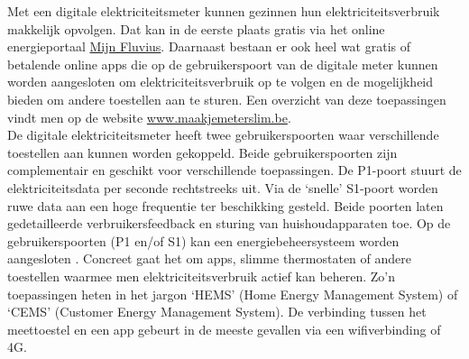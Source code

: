 \documentclass{hogent-article}
\begin{document}
Met een digitale elektriciteitsmeter kunnen gezinnen hun elektriciteitsverbruik makkelijk opvolgen. Dat kan in de eerste plaats gratis via het online energieportaal \href{https://login.fluvius.be/klanten.onmicrosoft.com/b2c_1a_customer_signup_signin/oauth2/v2.0/authorize?client_id=91bb9a0a-f45d-491a-ae0b-43324fbc343a&scope=openid%20profile%20offline_access&redirect_uri=https%3A%2F%2Fmijn.fluvius.be%2Fredirect&client-request-id=90c12c72-7d7b-428b-98fc-5d7956e53a60&response_mode=fragment&response_type=code&x-client-SKU=msal.js.browser&x-client-VER=2.23.0&client_info=1&code_challenge=jz-1E8AwB15UEa352eC_5x6zDtAtwp3Je6jrFVdGKjk&code_challenge_method=S256&nonce=cee3d720-d931-4b13-b0b5-c473169ca6fd&state=eyJpZCI6IjRhM2I3M2NkLTgyZjgtNDFjOC05NzAyLTEwMTNjNjNkNjNhMyIsIm1ldGEiOnsiaW50ZXJhY3Rpb25UeXBlIjoicmVkaXJlY3QifX0%3D}{Mijn Fluvius}. Daarnaast bestaan er ook heel wat gratis of betalende online apps die op de gebruikerspoort van de digitale meter kunnen worden aangesloten om elektriciteitsverbruik op te volgen en de mogelijkheid bieden om andere toestellen aan te sturen. Een overzicht van deze toepassingen vindt men op de website \href{https://maakjemeterslim.be/}{www.maakjemeterslim.be}. \\

De digitale elektriciteitsmeter heeft twee gebruikerspoorten waar verschillende toestellen aan kunnen worden gekoppeld. Beide gebruikerspoorten zijn complementair en geschikt voor verschillende toepassingen. De P1-poort stuurt de elektriciteitsdata per seconde rechtstreeks uit. Via de ‘snelle’ S1-poort worden ruwe data aan een hoge frequentie ter beschikking gesteld. Beide poorten laten gedetailleerde verbruikersfeedback en sturing van huishoudapparaten toe. Op de gebruikerspoorten (P1 en/of S1) kan een energiebeheersysteem worden aangesloten \autocite{Depuydt2021}. Concreet gaat het om apps, slimme thermostaten of andere toestellen waarmee men elektriciteitsverbruik actief kan beheren. Zo’n toepassingen heten in het jargon ‘HEMS’ (Home Energy Management System) of ‘CEMS’ (Customer Energy Management System). De verbinding tussen het meettoestel en een app gebeurt in de meeste gevallen via een wifiverbinding of 4G. \\
\end{document}
